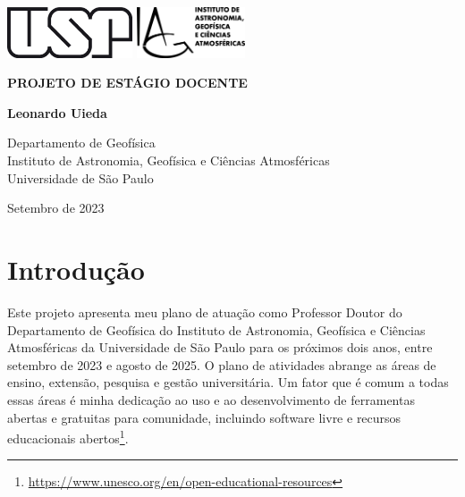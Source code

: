 \documentclass[11pt,a4paper,oneside]{book}
\newcommand{\Title}{Projeto de estágio docente}
\newcommand{\Year}{2023}
\newcommand{\Date}{Setembro de \Year{}}
\newcommand{\Author}{Leonardo Uieda}
\begin{document}
\pagestyle{empty}
\frontmatter

\begin{titlepage}
  \begin{center}
    \includegraphics[height=1.5cm]{figures/usp.png}
    \hfill
    \includegraphics[height=1.5cm]{figures/iag.png}
    \vspace{9cm}

    \textbf{\Huge \MakeUppercase{\Title{}}}
    \vspace{2cm}

    \textbf{\LARGE \Author{}}
    \vfill

    Departamento de Geofísica
    \\
    Instituto de Astronomia, Geofísica e Ciências Atmosféricas
    \\
    Universidade de São Paulo
    \vspace{2cm}

    \Date{}
  \end{center}
\end{titlepage}

\tableofcontents

\mainmatter
\pagestyle{fancy}

\chapter{Introdução}

Este projeto apresenta meu plano de atuação como Professor Doutor do
Departamento de Geofísica do Instituto de Astronomia, Geofísica e Ciências
Atmosféricas da Universidade de São Paulo para os próximos dois anos, entre
setembro de 2023 e agosto de 2025.
O plano de atividades abrange as áreas de ensino, extensão, pesquisa e gestão
universitária.
Um fator que é comum a todas essas áreas é minha dedicação ao uso e ao
desenvolvimento de ferramentas abertas e gratuitas para comunidade, incluindo
software livre e recursos educacionais
abertos\footnote{\url{https://www.unesco.org/en/open-educational-resources}}.
\end{document}
